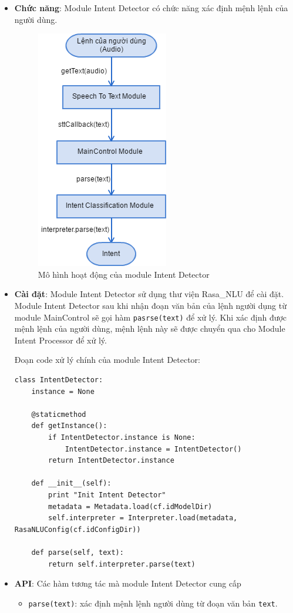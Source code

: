\begin{itemize}
\item \textbf{Chức năng}: Module Intent Detector có chức năng xác định mệnh lệnh của người dùng.

\begin{figure}[h]
    \centering
    \includegraphics[scale=0.5]{intent_classification_flowchart}
    \caption{Mô hình hoạt động của module Intent Detector}
    \label{fig:c6_intent_classification_flowchart}
\end{figure}

\item \textbf{Cài đặt}: Module Intent Detector sử dụng thư viện Rasa\_NLU để cài đặt. Module Intent Detector sau khi nhận đoạn văn bản của lệnh người dụng từ module MainControl sẽ gọi hàm \lstinline{pasrse(text)} để xử lý. Khi xác định được mệnh lệnh của người dùng, mệnh lệnh này sẽ được chuyển qua cho Module Intent Processor để xử lý.

Đoạn code xử lý chính của module Intent Detector:
\begin{lstlisting}
class IntentDetector:
    instance = None

    @staticmethod
    def getInstance():
        if IntentDetector.instance is None:
            IntentDetector.instance = IntentDetector()
        return IntentDetector.instance

    def __init__(self):
        print "Init Intent Detector"
        metadata = Metadata.load(cf.idModelDir)
        self.interpreter = Interpreter.load(metadata, RasaNLUConfig(cf.idConfigDir))

    def parse(self, text):
        return self.interpreter.parse(text)
\end{lstlisting}

\item \textbf{API}: Các hàm tương tác mà module Intent Detector cung cấp
\begin{itemize}
\item \lstinline{parse(text)}: xác định mệnh lệnh người dùng từ đoạn văn bản \lstinline{text}.
\end{itemize}
\end{itemize}

